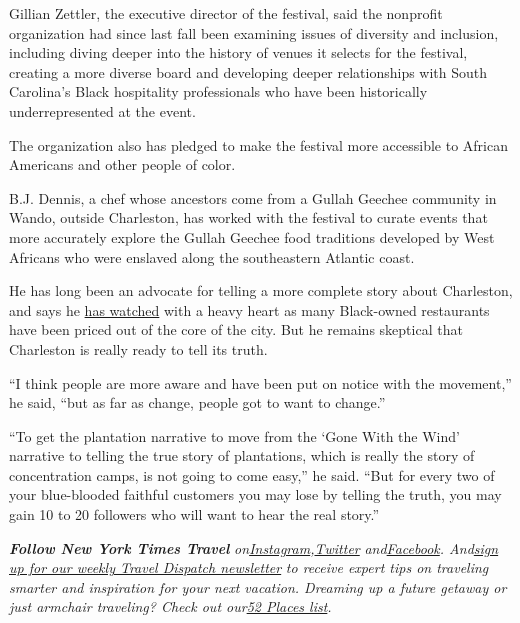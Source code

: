 Gillian Zettler, the executive director of the festival, said the
nonprofit organization had since last fall been examining issues of
diversity and inclusion, including diving deeper into the history of
venues it selects for the festival, creating a more diverse board and
developing deeper relationships with South Carolina's Black hospitality
professionals who have been historically underrepresented at the event.

The organization also has pledged to make the festival more accessible
to African Americans and other people of color.

B.J. Dennis, a chef whose ancestors come from a Gullah Geechee community
in Wando, outside Charleston, has worked with the festival to curate
events that more accurately explore the Gullah Geechee food traditions
developed by West Africans who were enslaved along the southeastern
Atlantic coast.

He has long been an advocate for telling a more complete story about
Charleston, and says he
\href{https://www.nytimes3xbfgragh.onion/2019/05/07/dining/charleston-restaurants.html}{has
watched} with a heavy heart as many Black-owned restaurants have been
priced out of the core of the city. But he remains skeptical that
Charleston is really ready to tell its truth.

``I think people are more aware and have been put on notice with the
movement,'' he said, ``but as far as change, people got to want to
change.''

``To get the plantation narrative to move from the `Gone With the Wind'
narrative to telling the true story of plantations, which is really the
story of concentration camps, is not going to come easy,'' he said.
``But for every two of your blue-blooded faithful customers you may lose
by telling the truth, you may gain 10 to 20 followers who will want to
hear the real story.''

\emph{\textbf{Follow New York Times Travel}}
\emph{on}\href{https://www.instagram.com/nytimestravel/}{\emph{Instagram}}\emph{,}\href{https://twitter.com/nytimestravel}{\emph{Twitter}}
\emph{and}\href{https://www.facebookcorewwwi.onion/nytimestravel/}{\emph{Facebook}}\emph{.
And}\href{https://www.nytimes3xbfgragh.onion/newsletters/traveldispatch}{\emph{sign
up for our weekly Travel Dispatch newsletter}} \emph{to receive expert
tips on traveling smarter and inspiration for your next vacation.
Dreaming up a future getaway or just armchair traveling? Check out
our}\href{https://www.nytimes3xbfgragh.onion/interactive/2020/travel/places-to-visit.html}{\emph{52
Places list}}\emph{.}

